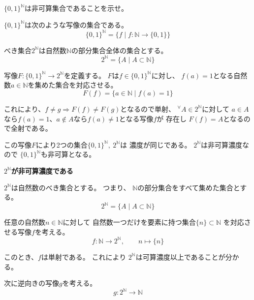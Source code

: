 \documentclass[12pt,b5paper]{ltjsarticle}
\begin{document}
\hrulefill

$\{0,1\}^{\mathbb{N}}$は非可算集合であることを示せ。

\dotfill

$\{0,1\}^{\mathbb{N}}$は次のような写像の集合である。
\begin{equation}
 \{0,1\}^{\mathbb{N}} =
  \{
  f \mid f:\mathbb{N}\to \{0,1\}
  \}
\end{equation}

べき集合$2^{\mathbb{N}}$は自然数$\mathbb{N}$の部分集合全体の集合とする。
\begin{equation}
 2^{\mathbb{N}} =
  \{
  A \mid A\subset \mathbb{N}
  \}
\end{equation}

写像$F:\{0,1\}^{\mathbb{N}} \to 2^{\mathbb{N}}$を定義する。
$F$は$f\in\{0,1\}^\mathbb{N}$に対し、
$f(a)=1$となる自然数$a\in\mathbb{N}$を集めた集合を対応させる。
\begin{equation}
 F(f)=\{a\in \mathbb{N} \mid f(a)=1 \}
\end{equation}

これにより、$f\ne g \Rightarrow F(f)\ne F(g)$となるので単射、
${}^\forall A\in 2^{\mathbb{N}}$に対して
$a\in A$なら$f(a)=1$、$a\not\in A$なら$f(a)\ne1$となる写像$f$が
存在し
$F(f)=A$となるので全射である。

この写像$F$により2つの集合$\{0,1\}^{\mathbb{N}} ,\ 2^{\mathbb{N}}$は
濃度が同じである。
$2^{\mathbb{N}}$は非可算濃度なので
$\{0,1\}^{\mathbb{N}}$も非可算となる。


\dotfill

\textbf{$2^{\mathbb{N}}$が非可算濃度である}

$2^{\mathbb{N}}$は自然数のべき集合とする。
つまり、%
$\mathbb{N}$の部分集合をすべて集めた集合とする。
\begin{equation}
 2^{\mathbb{N}}
  =
  \{ A \mid A \subset \mathbb{N}\}
\end{equation}

任意の自然数$n\in\mathbb{N}$に対して
自然数一つだけを要素に持つ集合$\{n\}\subset\mathbb{N}$
を対応させる写像$f$を考える。
\begin{equation}
 f: \mathbb{N} \to 2^{\mathbb{N}}
  ,\qquad
  n \mapsto \{n\}
\end{equation}

このとき、$f$は単射である。
これにより
$2^{\mathbb{N}}$は可算濃度以上であることが分かる。


次に逆向きの写像$g$を考える。
\begin{equation}
 g: 2^{\mathbb{N}} \to \mathbb{N}
\end{equation}
\end{document}
